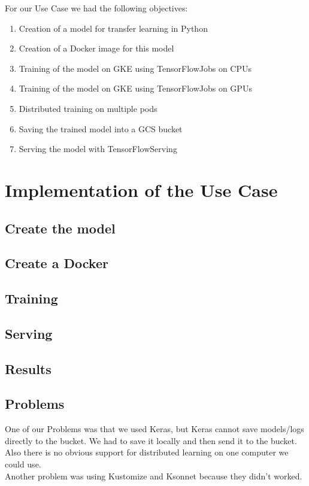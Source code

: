 \documentclass[12pt,a4paper]{scrartcl}		%
\begin{document}
\noindent For our Use Case we had the following objectives:
\begin{enumerate}
\item Creation of a model for transfer learning in Python
\item Creation of a Docker image for this model
\item Training of the model on GKE using TensorFlowJobs on CPUs
\item Training of the model on GKE using TensorFlowJobs on GPUs
\item Distributed training on multiple pods
\item Saving the trained model into a GCS bucket
\item Serving the model with TensorFlowServing
\end{enumerate}


\section{Implementation of the Use Case}

\subsection{Create the model}

\subsection{Create a Docker}

\subsection{Training}

\subsection{Serving}

\subsection{Results}

\subsection{Problems}

\noindent One of our Problems was that we used Keras, but Keras cannot save models/logs directly to the bucket. We had to save it locally and then send it to the bucket. \\
Also there is no obvious support for distributed learning on one computer we could use. \\
Another problem was using Kustomize and Ksonnet because they didn't worked.
\end{document}
